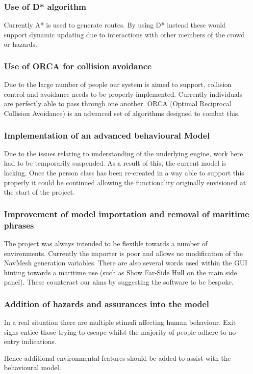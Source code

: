 \subsubsection{Use of D{*} algorithm}

Currently A{*} is used to generate routes. By using D{*} instead these
would support dynamic updating due to interactions with other members
of the crowd or hazards.


\subsubsection{Use of ORCA for collision avoidance}
\label{Problems:subsubsec:ORCA}

Due to the large number of people our system is aimed to support, collision
control and avoidance needs to be properly implemented. Currently
individuals are perfectly able to pass through one another. ORCA (Optimal
Reciprocal Collision Avoidance) is an advanced set of algorithms designed
to combat this.


\subsubsection{Implementation of an advanced behavioural Model}

Due to the issues relating to understanding of the underlying engine,
work here had to be temporarily suspended. As a result of this, the
current model is lacking. Once the person class has been
re-created in a way able to support this properly it could be continued
allowing the functionality originally envisioned at the start of the
project.


\subsubsection{Improvement of model importation and removal of maritime phrases}

The project was always intended to be flexible towards a number of
environments. Currently the importer is poor and allows no modification
of the NavMesh generation variables. There are also several words
used within the GUI hinting towards a maritime use (such as Show Far-Side
Hull on the main side panel). These counteract our aims by suggesting
the software to be bespoke.


\subsubsection{Addition of hazards and assurances into the model}

In a real situation there are multiple stimuli affecting human behaviour.
Exit signs entice those trying to escape whilst the majority of people
adhere to no-entry indications.

Hence additional environmental features should be added to assist
with the behavioural model.



